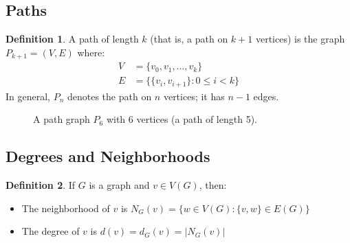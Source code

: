 \documentclass{article}
\theoremstyle{definition}
\newtheorem{definition}{Definition}
\begin{document}
\subsection{Paths}
\begin{definition}
A path of length $k$ (that is, a path on $k+1$ vertices) is the graph $P_{k+1} = (V, E)$ where:
\begin{align*}
V &= \{v_0, v_1, \ldots, v_k\}\\
E &= \{\{v_i, v_{i+1}\} : 0 \leq i < k\}
\end{align*}
In general, $P_n$ denotes the path on $n$ vertices; it has $n-1$ edges.
\end{definition}

\begin{figure}[H]
\centering
{}
\caption{A path graph $P_6$ with 6 vertices (a path of length 5).}
\end{figure}

\subsection{Degrees and Neighborhoods}

\begin{definition}
If $G$ is a graph and $v \in V(G)$, then:
\begin{itemize}
\item The neighborhood of $v$ is $N_G(v) = \{w \in V(G) : \{v,w\} \in E(G)\}$
\item The degree of $v$ is $d(v) = d_G(v) = |N_G(v)|$
\end{itemize}
\end{definition}
\end{document}
